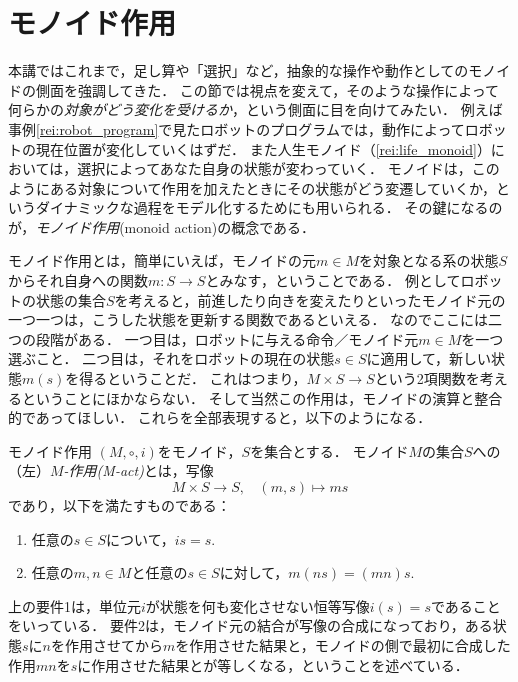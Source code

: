 \documentclass[11pt,a4paper, dvipdfmx]{jsarticle}
\begin{document}
\section{モノイド作用}
本講ではこれまで，足し算や「選択」など，抽象的な操作や動作としてのモノイドの側面を強調してきた．
この節では視点を変えて，そのような操作によって何らかの\emph{対象がどう変化を受けるか}，という側面に目を向けてみたい．
例えば事例\ref{rei:robot_program}で見たロボットのプログラムでは，動作によってロボットの現在位置が変化していくはずだ．
また人生モノイド（\ref{rei:life_monoid}）においては，選択によってあなた自身の状態が変わっていく．
モノイドは，このようにある対象について作用を加えたときにその状態がどう変遷していくか，というダイナミックな過程をモデル化するためにも用いられる．
その鍵になるのが，\emph{モノイド作用}(monoid action)の概念である．

モノイド作用とは，簡単にいえば，モノイドの元$m \in M$を対象となる系の状態$S$からそれ自身への関数$m:S \to S$とみなす，ということである．
例としてロボットの状態の集合$S$を考えると，前進したり向きを変えたりといったモノイド元の一つ一つは，こうした状態を更新する関数であるといえる．
なのでここには二つの段階がある．
一つ目は，ロボットに与える命令／モノイド元$m \in M$を一つ選ぶこと．
二つ目は，それをロボットの現在の状態$s \in S$に適用して，新しい状態$m(s)$を得るということだ．
これはつまり，$M \times S \to S$という2項関数を考えるということにほかならない．
そして当然この作用は，モノイドの演算と整合的であってほしい．
これらを全部表現すると，以下のようになる．

\begin{dfn}{モノイド作用}{}
 $(M, \circ, i)$をモノイド，$S$を集合とする．
 モノイド$M$の集合$S$への（左）\emph{$M$-作用(M-act)}とは，写像
 \[
  M \times S \to S, \ \ \ \ (m, s) \mapsto ms
 \]
 であり，以下を満たすものである：
 \begin{enumerate}
  \item 任意の$s \in S$について，$is = s$.
  \item 任意の$m, n \in M$と任意の$s \in S$に対して，$m(ns) = (mn)s$.
 \end{enumerate}
\end{dfn}
上の要件1は，単位元$i$が状態を何も変化させない恒等写像$i(s)=s$であることをいっている．
要件2は，モノイド元の結合が写像の合成になっており，ある状態$s$に$n$を作用させてから$m$を作用させた結果と，モノイドの側で最初に合成した作用$mn$を$s$に作用させた結果とが等しくなる，ということを述べている．
\end{document}
